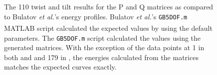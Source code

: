 \documentclass[twoside,senior]{BYUPhys}
\begin{document}
\begin{figure}[ht!]
 \centering
 
 \quad
 \caption[A comparison of the \textlangle{}110\textrangle{} copper curves with the calculated results.]{\label{appfig:compare110} The \textlangle{}110\textrangle{} twist \protect{} and tilt \protect{} results for the P and Q matrices as compared to Bulatov \emph{et al.}'s energy profiles. Bulatov \emph{et al.}'s \lstinline!GB5DOF.m! MATLAB\textsuperscript{\textregistered} script calculated the expected values by using the default parameters.  The \lstinline!GB5DOF.m! script calculated the values using the generated matrices. With the exception of the data points at 1\textdegree{} in both \protect{} and \protect{} and 179\textdegree{} in \protect{}, the energies calculated from the matrices matches the expected curves exactly.}
\end{figure}
\end{document}
